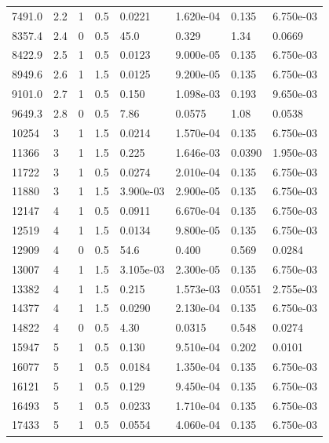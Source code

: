 \documentclass[preview]{standalone}
\begin{document}
{{\begin{tabular}{L{1.2cm}C{1.2cm} C{0.3cm}C{0.5cm} C{1.4cm}C{1.4cm} C{1.4cm}C{1.4cm}}
  7491.0  &   2.2  & 1     & 0.5 &  0.0221  & 1.620e-04  & 0.135 &  6.750e-03   \\ 
  8357.4  &   2.4  & 0     & 0.5 &  45.0  & 0.329  & 1.34 &  0.0669   \\ 
  8422.9  &   2.5  & 1     & 0.5 &  0.0123  & 9.000e-05  & 0.135 &  6.750e-03   \\ 
  8949.6  &   2.6  & 1     & 1.5 &  0.0125  & 9.200e-05  & 0.135 &  6.750e-03   \\ 
  9101.0  &   2.7  & 1     & 0.5 &  0.150  & 1.098e-03  & 0.193 &  9.650e-03   \\ 
  9649.3  &   2.8  & 0     & 0.5 &  7.86  & 0.0575  & 1.08 &  0.0538   \\ 
  10254  &     3  & 1     & 1.5 &  0.0214  & 1.570e-04  & 0.135 &  6.750e-03   \\ 
  11366  &     3  & 1     & 1.5 &  0.225  & 1.646e-03  & 0.0390 &  1.950e-03   \\ 
  11722  &     3  & 1     & 0.5 &  0.0274  & 2.010e-04  & 0.135 &  6.750e-03   \\ 
  11880  &     3  & 1     & 1.5 &  3.900e-03  & 2.900e-05  & 0.135 &  6.750e-03   \\ 
  12147  &     4  & 1     & 0.5 &  0.0911  & 6.670e-04  & 0.135 &  6.750e-03   \\ 
  12519  &     4  & 1     & 1.5 &  0.0134  & 9.800e-05  & 0.135 &  6.750e-03   \\ 
  12909  &     4  & 0     & 0.5 &  54.6  & 0.400  & 0.569 &  0.0284   \\ 
  13007  &     4  & 1     & 1.5 &  3.105e-03  & 2.300e-05  & 0.135 &  6.750e-03   \\ 
  13382  &     4  & 1     & 1.5 &  0.215  & 1.573e-03  & 0.0551 &  2.755e-03   \\ 
  14377  &     4  & 1     & 1.5 &  0.0290  & 2.130e-04  & 0.135 &  6.750e-03   \\ 
  14822  &     4  & 0     & 0.5 &  4.30  & 0.0315  & 0.548 &  0.0274   \\ 
  15947  &     5  & 1     & 0.5 &  0.130  & 9.510e-04  & 0.202 &  0.0101   \\ 
  16077  &     5  & 1     & 0.5 &  0.0184  & 1.350e-04  & 0.135 &  6.750e-03   \\ 
  16121  &     5  & 1     & 0.5 &  0.129  & 9.450e-04  & 0.135 &  6.750e-03   \\ 
  16493  &     5  & 1     & 0.5 &  0.0233  & 1.710e-04  & 0.135 &  6.750e-03   \\ 
  17433  &     5  & 1     & 0.5 &  0.0554  & 4.060e-04  & 0.135 &  6.750e-03   \\ 

\end{tabular}}}
\end{document}
